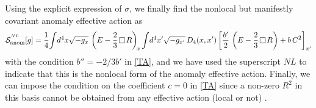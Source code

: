 \documentclass[a4paper,11pt,openright,twoside]{book}
\def\nbox#1#2{\vcenter{\hrule \hbox{\vrule height#2in
			\kern#1in \vrule} \hrule}}
\def\sq{\,\raise.5pt\hbox{$\nbox{.09}{.09}$}\,}
\numberwithin{equation}{section}
\begin{document}
{{{{	Using the explicit expression of $\sigma$, we finally find the nonlocal but manifestly covariant anomaly effective action as
	\begin{equation}
		\mathcal{S}_{\rm anom}^{^{NL}}[g] =\frac {1}{4}\!\int \!d^4x\sqrt{-g_x}\, \left(E - \frac{2}{3}\sq R\right)_{\!x} 
		\int\! d^4x'\sqrt{-g_{x'}}\,D_4(x,x')\left[\frac{b'}{2}\, \left(E - \frac{2}{3}\sq R\right) +  b\,C^2\right]_{x'}
		\label{Snonl}
	\end{equation}
	with the condition $b''=-2/3b'$ in \eqref{TA}, and we have used the superscript $NL$ to indicate that this is the nonlocal form of the anomaly effective action. Finally, we can impose the condition on the coefficient $c=0$ in \eqref{TA} since a non-zero $R^2$ in this basis cannot be obtained from any effective action (local or not) \cite{Antoniadis:1992xu, Bonora:83, Mazur:2001aa}. 
}
}}}
\end{document}
